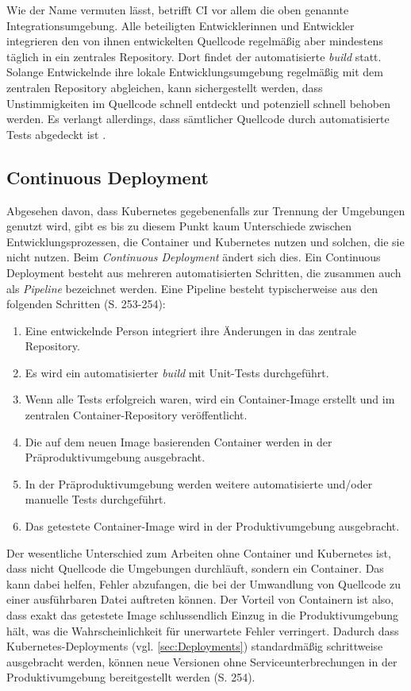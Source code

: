 \documentclass[11pt,a4paper]{article}
\begin{document}
Wie der Name vermuten lässt, betrifft CI vor allem die oben genannte Integrationsumgebung.
Alle beteiligten Entwicklerinnen und Entwickler integrieren den von ihnen
entwickelten Quellcode regelmäßig aber mindestens täglich in ein zentrales
Repository. Dort findet der automatisierte \emph{build} statt.
Solange Entwickelnde ihre lokale Entwicklungsumgebung regelmäßig mit dem
zentralen Repository abgleichen, kann sichergestellt werden, dass
Unstimmigkeiten im Quellcode schnell entdeckt und potenziell schnell behoben werden.
Es verlangt allerdings, dass sämtlicher Quellcode durch automatisierte
Tests abgedeckt ist \cite{fowler_Continuous_Integration}.

\subsection{Continuous Deployment}
Abgesehen davon, dass Kubernetes gegebenenfalls zur Trennung der Umgebungen genutzt wird,
gibt es bis zu diesem Punkt kaum Unterschiede zwischen Entwicklungsprozessen,
die Container und Kubernetes nutzen und solchen, die sie nicht nutzen.
Beim \emph{Continuous Deployment} ändert sich dies.
Ein Continuous Deployment besteht aus mehreren automatisierten Schritten,
die zusammen auch als \emph{Pipeline} bezeichnet werden.
Eine Pipeline besteht typischerweise aus den folgenden Schritten \cite{domingus2022cloud} (S. 253-254):
\begin{enumerate}
  \item Eine entwickelnde Person integriert ihre Änderungen in das zentrale Repository.
  \item Es wird ein automatisierter \emph{build} mit Unit-Tests durchgeführt.
  \item Wenn alle Tests erfolgreich waren, wird ein Container-Image erstellt und im zentralen Container-Repository veröffentlicht.
  \item Die auf dem neuen Image basierenden Container werden in der Präproduktivumgebung ausgebracht.
  \item In der Präproduktivumgebung werden weitere automatisierte und/oder manuelle Tests durchgeführt.
  \item Das getestete Container-Image wird in der Produktivumgebung ausgebracht.
\end{enumerate}
Der wesentliche Unterschied zum Arbeiten ohne Container und Kubernetes ist, dass nicht Quellcode
die Umgebungen durchläuft, sondern ein Container. Das kann dabei helfen, Fehler abzufangen,
die bei der Umwandlung von Quellcode zu einer ausführbaren Datei auftreten können.
Der Vorteil von Containern ist also, dass exakt das getestete Image schlussendlich
Einzug in die Produktivumgebung hält, was die Wahrscheinlichkeit für unerwartete Fehler verringert.
Dadurch dass Kubernetes-Deployments (vgl. \ref{sec:Deployments}) standardmäßig schrittweise ausgebracht werden,
können neue Versionen ohne Serviceunterbrechungen in der Produktivumgebung bereitgestellt werden \cite{domingus2022cloud} (S. 254).
\end{document}
